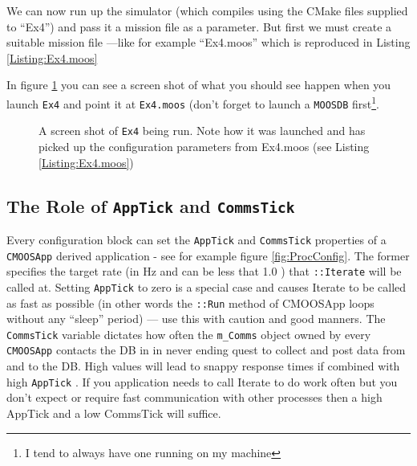 \documentclass[a4paper,10pt]{article}
\newcommand{\Code}[1]{\texttt{#1} }
\newcommand{\code}[1]{\Code{#1} }
\begin{document}


We can now run up the simulator (which compiles using the CMake files supplied to ``Ex4'') and pass it a mission file as a parameter. But first we must create a suitable mission file ---like for example ``Ex4.moos'' which is reproduced in Listing \ref{Listing:Ex4.moos}



In figure \ref{Fig:RunningEx4} you can see a screen shot of what you should see happen when you launch \code{Ex4} and point it at \code{Ex4.moos} (don't forget to launch a \code{MOOSDB} first\footnote{I tend to always have one running on my machine}.

\begin{figure}
\begin{center}
\end{center}
\caption{A screen shot of \code{Ex4} being run. Note how it was launched and has picked up the configuration parameters from Ex4.moos (see Listing \ref{Listing:Ex4.moos})}\label{Fig:RunningEx4}
\end{figure}


\subsection{The Role of \code{AppTick} and \code{CommsTick }}

Every configuration block can set the \code{AppTick} and \code{CommsTick} properties of a \code{CMOOSApp} derived application - see for example figure \ref{fig:ProcConfig}. The former specifies the target rate (in Hz and can be less that 1.0 ) that \code{::Iterate} will be called at. Setting \code{AppTick} to zero is a special case and causes Iterate to be called as fast as possible (in other words the \code{::Run} method of CMOOSApp loops without any ``sleep'' period) --- use this with caution and good manners. The \code{CommsTick} variable dictates how often the \code{m\_Comms} object owned by every \code{CMOOSApp} contacts the DB in in never ending quest to collect and post data from and to the DB. High values will lead to snappy response times if combined with high \code{AppTick}. If you application needs to call Iterate to do work often but you don't expect or require fast communication with other processes then a high AppTick and a low CommsTick will suffice.
\end{document}
